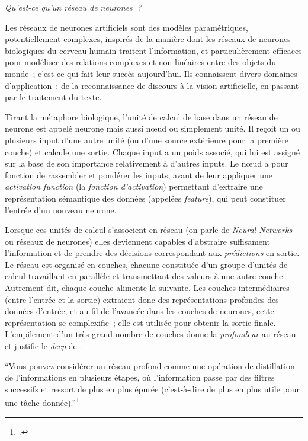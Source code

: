\emph{Qu'est-ce qu'un réseau de neurones~?}

Les réseaux de neurones artificiels sont des modèles paramétriques,
potentiellement complexes, inspirés de la manière dont les réseaux de
neurones biologiques du cerveau humain traitent l'information, et
particulièrement efficaces pour modéliser des relations complexes et non
linéaires entre des objets du monde~; c'est ce qui fait leur succès
aujourd'hui. Ils connaissent divers domaines d'application~: de la
reconnaissance de discours à la vision artificielle, en passant par le
traitement du texte.

Tirant la métaphore biologique, l'unité de calcul de base dans un réseau
de neurone est appelé neurone mais aussi nœud ou simplement unité. Il
reçoit un ou plusieurs input d'une autre unité (ou d'une source
extérieure pour la première couche) et calcule une sortie. Chaque input
a un poids associé, qui lui est assigné sur la base de son importance
relativement à d'autres inputs. Le nœud a pour fonction de rassembler et
pondérer les inputs, avant de leur appliquer une \emph{activation
function} (la \emph{fonction d'activation}) permettant d'extraire une
représentation sémantique des données (appelées \emph{feature}), qui
peut constituer l'entrée d'un nouveau neurone.

Lorsque ces unités de calcul s'associent en réseau (on parle de
\emph{Neural Networks} ou réseaux de neurones) elles deviennent capables
d'abstraire suffisament l'information et de prendre des décisions
correspondant aux \emph{prédictions} en sortie. Le réseau est organisé
en couches, chacune constituée d'un groupe d'unités de calcul
travaillant en parallèle et transmettant des valeurs à une autre couche.
Autrement dit, chaque couche alimente la suivante. Les couches
intermédiaires (entre l'entrée et la sortie) extraient donc des
représentations profondes des données d'entrée, et au fil de l'avancée
dans les couches de neurones, cette représentation se complexifie~; elle
est utilisée pour obtenir la sortie finale. L'empilement d'un très grand
nombre de couches donne la \emph{profondeur} au réseau et justifie le
\emph{deep} de \dl.

\begin{kwote}
``Vous pouvez considérer un réseau profond comme une opération de distillation de l'informations en plusieurs étapes, où l'information passe par des filtres successifs et ressort de plus en plus épurée (c'est-à-dire de plus en plus utile pour une tâche donnée).''\footcite[p.12]{chollet_apprentissage_2020}
\end{kwote}

